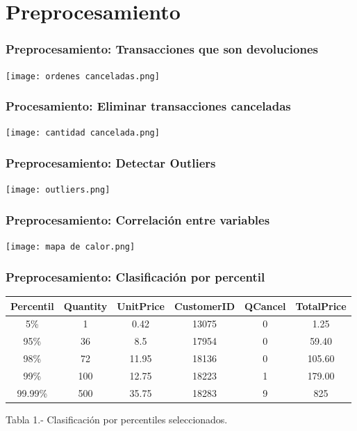 \documentclass{beamer}
\begin{document}
\section{Preprocesamiento}

\begin{frame}
\frametitle{Preprocesamiento: Transacciones que son devoluciones}
\begin{center} 
    \texttt{[image: ordenes canceladas.png]}
\end{center}
\end{frame}
\begin{frame}
\frametitle{Procesamiento: Eliminar transacciones canceladas}
\begin{center} 
    \texttt{[image: cantidad cancelada.png]}
\end{center}
\end{frame}
\begin{frame}
\frametitle{Preprocesamiento: Detectar Outliers}

\begin{center}
    \texttt{[image: outliers.png]}
\end{center}
\end{frame}
\begin{frame}
\frametitle{Preprocesamiento: Correlación entre variables}

\begin{center}
    \texttt{[image: mapa de calor.png]}
\end{center}
\end{frame}
\begin{frame}
\frametitle{Preprocesamiento: Clasificación por percentil}
\centering
\begin{center}
\begin{tabular}{|c|c|c|c|c|c| }
\hline 
Percentil & Quantity & UnitPrice & CustomerID & QCancel & TotalPrice \\ 
\hline 
5\% & 1 & 0.42 & 13075 & 0 & 1.25 \\ 
\hline 
95\% & 36 & 8.5 & 17954 & 0 & 59.40 \\
\hline 
98\% & 72 & 11.95 & 18136 & 0 & 105.60 \\
\hline 
99\% & 100 & 12.75 & 18223 & 1 & 179.00 \\
\hline 
99.99\% & 500 & 35.75 & 18283 & 9 & 825 \\
\hline 

\end{tabular}
\caption{Tabla 1.- Clasificación por percentiles seleccionados.}
\end{center}
\end{frame}
\end{document}
